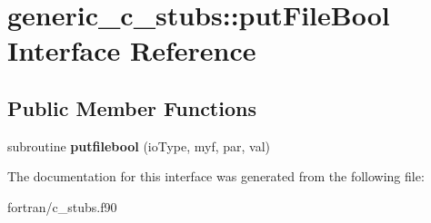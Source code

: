 \hypertarget{interfacegeneric__c__stubs_1_1put_file_bool}{}\section{generic\+\_\+c\+\_\+stubs\+:\+:put\+File\+Bool Interface Reference}
\label{interfacegeneric__c__stubs_1_1put_file_bool}
\subsection*{Public Member Functions}
\begin{DoxyCompactItemize}
\item 
\mbox{\label{interfacegeneric__c__stubs_1_1put_file_bool_a046780452e9795ea97465f7d4d7e1755}} 
subroutine {\bfseries putfilebool} (io\+Type, myf, par, val)
\end{DoxyCompactItemize}


The documentation for this interface was generated from the following file\+:\begin{DoxyCompactItemize}
\item 
fortran/c\+\_\+stubs.\+f90\end{DoxyCompactItemize}
